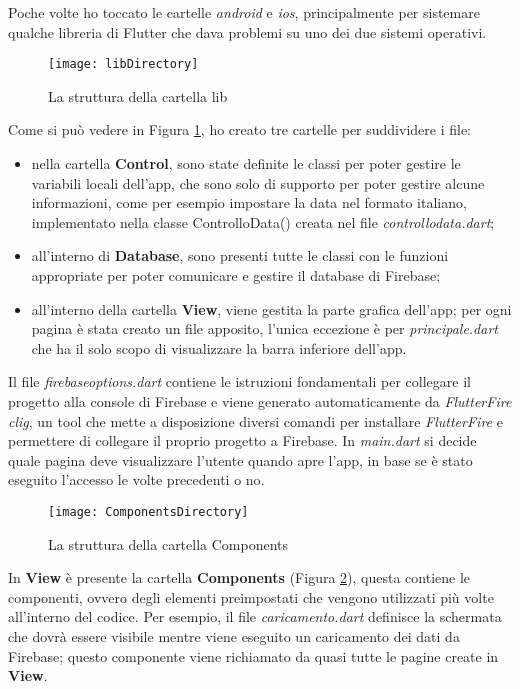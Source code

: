 Poche volte ho toccato le cartelle \emph{android} e \emph{ios}, principalmente per sistemare qualche libreria di Flutter che dava problemi su uno dei due sistemi operativi. 
\newpage
\begin{figure}[!h] 
    \centering 
    \texttt{[image: libDirectory]} 
    \caption{La struttura della cartella lib}
    \label{fig:directory-lib}
\end{figure}
Come si può vedere in Figura \ref{fig:directory-lib}, ho creato tre cartelle per suddividere i file:
\begin{itemize}
    \item nella cartella \textbf{Control}, sono state definite le classi per poter gestire le variabili locali dell'app, che sono solo di supporto per poter gestire alcune informazioni, come per esempio impostare la data nel formato italiano, implementato nella classe ControlloData() creata nel file \emph{controllo\textunderscore  data.dart};
    \item all'interno di \textbf{Database}, sono presenti tutte le classi con le funzioni appropriate per poter comunicare e gestire il database di Firebase;
    \item all'interno della cartella \textbf{View}, viene gestita la parte grafica dell'app; per ogni pagina è stata creato un file apposito, l'unica eccezione è per \emph{principale.dart} che ha il solo scopo di visualizzare la barra inferiore dell'app.
\end{itemize}
Il file \emph{firebase\textunderscore options.dart} contiene le istruzioni fondamentali per collegare il progetto alla console di Firebase e viene generato automaticamente da \emph{FlutterFire \gls{clig}\glsfirstoccur}, un tool che mette a disposizione diversi comandi per installare \emph{FlutterFire} e permettere di collegare il proprio progetto a Firebase.\newline
In \emph{main.dart} si decide quale pagina deve visualizzare l'utente quando apre l'app, in base se è stato eseguito l'accesso le volte precedenti o no.
\begin{figure}[!h] 
    \centering 
    \texttt{[image: ComponentsDirectory]} 
    \caption{La struttura della cartella Components}
    \label{fig:directory-components}
\end{figure}

In \textbf{View} è presente la cartella \textbf{Components} (Figura \ref{fig:directory-components}), questa contiene le componenti, ovvero degli elementi preimpostati che vengono utilizzati più volte all'interno del codice.\newline
Per esempio, il file \emph{caricamento.dart} definisce la schermata che dovrà essere visibile mentre viene eseguito un caricamento dei dati da Firebase; questo componente viene richiamato da quasi tutte le pagine create in \textbf{View}.


